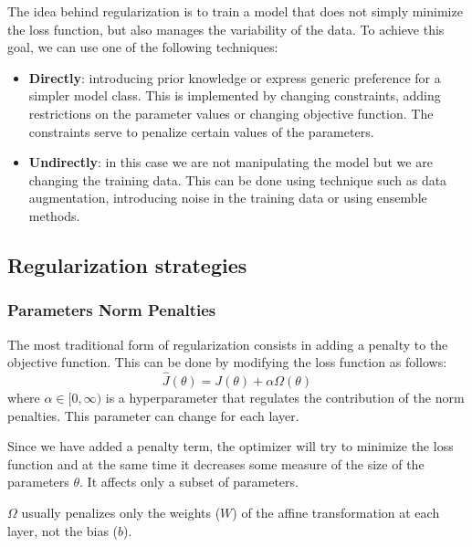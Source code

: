 The idea behind regularization is to train a model that does not simply minimize
the loss function, but also manages the variability of the data. To achieve this
goal, we can use one of the following techniques:
\begin{itemize}
    \item \textbf{Directly}: introducing prior knowledge or express generic
          preference for a simpler model class. This is implemented by changing
          constraints, adding restrictions on the parameter values or changing
          objective function. The constraints serve to penalize certain values
          of the parameters.
    \item \textbf{Undirectly}: in this case we are not manipulating the model but
          we are changing the training data. This can be done using technique
          such as data augmentation, introducing noise in the training data or
          using ensemble methods.
\end{itemize}
\subsection{Regularization strategies}
\subsubsection{Parameters Norm Penalties}
The most traditional form of regularization consists in adding a penalty to the
objective function. This can be done by modifying the loss function as follows:
\begin{equation}
    \hat{J}(\theta) = J(\theta) + \alpha \Omega(\theta)
\end{equation}
where $\alpha \in [0, \infty)$ is a hyperparameter that regulates the contribution
of the norm penalties. This parameter can change for each layer.

Since we have added a penalty term, the optimizer will try to minimize the loss
function and at the same time it decreases some measure of the size of the
parameters $\theta$. It affects only a subset of parameters.

$\Omega$ usually penalizes only the weights ($W$) of the affine transformation
at each layer, not the bias ($b$).

